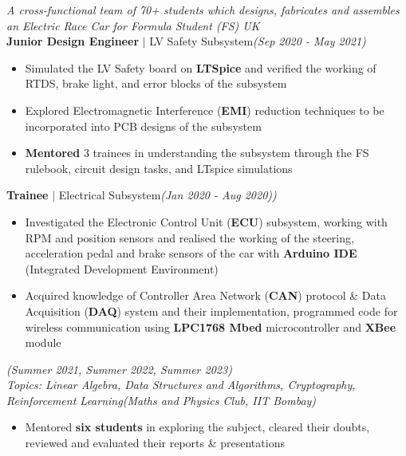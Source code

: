 \documentclass[10pt, a4paper]{article}
\newcommand{\lhsmall}[1]{{\small{\textit{#1}}}}
\newcommand{\rhsmall}[1]{\hfill{\footnotesize{\textsl{(#1)}}}}
\newcommand{\rhsmalle}[1]{\hfill{\footnotesize{\textsl{(#1)}}}\\[-12pt]}
\newcommand{\CFont}{\fontsize{11}{13.2}\selectfont}
\newcommand{\head}[1]{\vspace{0.2em}{\CFont{\textbf{#1}}}}
\begin{document}
{\small\textsl{A cross-functional team of 70+ students which designs, fabricates and assembles an Electric Race Car for Formula Student (FS) UK}}\\%
{\small\textbf{Junior Design Engineer} $\mid$ LV Safety Subsystem}\rhsmalle{Sep 2020 - May 2021}
\begin{itemize}
	\item Simulated the LV Safety board on \textbf{LTSpice} and verified the working of RTDS, brake light, and error blocks of the subsystem
	\item Explored Electromagnetic Interference (\textbf{EMI}) reduction techniques to be incorporated into PCB designs of the subsystem
	\item \textbf{Mentored} 3 trainees in understanding the subsystem through the FS rulebook, circuit design tasks, and LTspice simulations
\end{itemize}
{\small\textbf{Trainee} \small$\mid$ Electrical Subsystem}\rhsmalle{Jan 2020 - Aug 2020)}
\begin{itemize}
	\item Investigated the {Electronic Control Unit} (\textbf{ECU}) subsystem, working with {RPM} and {position sensors} and realised the working of the steering, acceleration pedal and brake sensors of the car with \textbf{Arduino IDE} (Integrated Development Environment)
	\item Acquired knowledge of {Controller Area Network} (\textbf{CAN}) protocol \& {Data Acquisition} (\textbf{DAQ}) system and their implementation, programmed code for wireless communication using \textbf{LPC1768 Mbed} microcontroller and \textbf{XBee} module
\end{itemize}
\head{Mentor $\mid$ Summer of Science}\rhsmall{Summer 2021, Summer 2022, Summer 2023}\\
\lhsmall{Topics: Linear Algebra, Data Structures and Algorithms, Cryptography, Reinforcement Learning}\rhsmalle{Maths and Physics Club, IIT Bombay}
\begin{itemize}
	\item Mentored \textbf{six students} in exploring the subject, cleared their doubts, reviewed and evaluated their reports \& presentations
\end{itemize}
\end{document}
